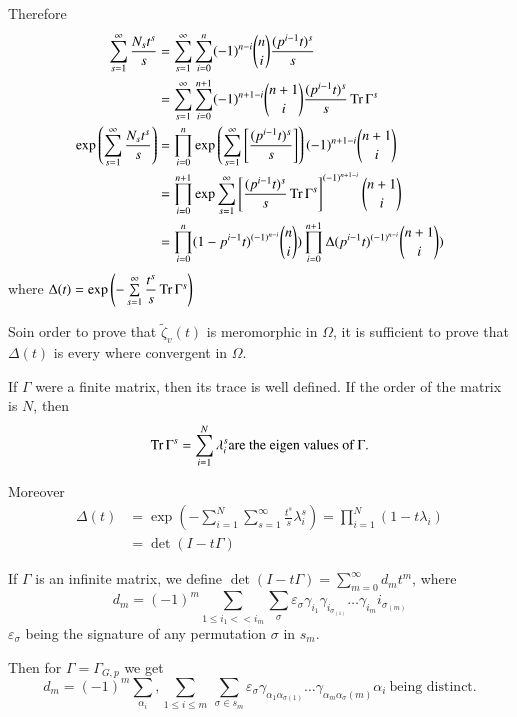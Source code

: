 Therefore
\begin{align*}
  \sum^{\infty}_{s=1} \frac{N_s t^s}{s} &= \sum^{\infty}_{s=1}
  \sum^{n}_{i=0} (-1)^{n-i} \binom{n}{i} \frac{(p^{i-1}t)^s}{s}
  \\ 
  &=\sum^{\infty}_{s=1} \sum^{n+1}_{i=0} (-1)^{n+1-i}
  \binom{n+1}{i}  \frac{(p^{i-1}t)^s}{s} \operatorname{Tr} \Gamma^s \\ 
  \exp \left( \sum^{\infty}_{s=1} \frac{N_s t^s}{s}\right) &= \prod^{n}_{i=0}
  \exp \left( \sum^{\infty}_{s=1} \left[\frac{(p^{i-1}t)^s}{s}
    \right]\right){(-1)^{n+1-i}} \binom{n+1}{i}\\  
  &=  \prod^{n+1}_{i=0} \exp \sum^{\infty}_{s=1}
  \left[\frac{(p^{i-1}t)^s}{s} \operatorname{Tr} \Gamma^s \right]^{(-1)^{n+1-i}}
  \binom{n+1}{i}\\ 
  &=  \prod^{n}_{i=0} (1-p^{i-1}t)^{(-1)^{n-i}} \binom{n}{i})
  \prod^{n+1}_{i=0} \Delta (p^{i-1}t)^{(-1)^{n-i}} \binom{n+1}{i}) 
\end{align*}  
where $\Delta (t) = \exp  \left( -\sum \limits^{\infty}_{s=1}
\dfrac{t^s}{s} \operatorname{Tr} \Gamma^s \right) $   
 
 So\pageoriginale in order to prove that $\tilde{\zeta}_v (t)$ is meromorphic in $\Omega$, it
 is sufficient to prove that $\Delta (t)$  is every where  convergent
 in $\Omega$. 
 
 If $\Gamma$ were a finite matrix, then its trace is well defined. If
 the order of the matrix is $N$, then 
 $$
 \operatorname{Tr} \Gamma^s = \sum^{N}_{i=1} \lambda^s_i \text{are the eigen values
   of} ~\Gamma. 
 $$
 
Moreover
\begin{align*}
  \Delta (t) &= \exp \left(- \sum^{N}_{i=1}  \sum^{\infty}_{s=1}
  \frac{t^s}{s} \lambda^s_i \right) = \prod^{N}_{i=1} (1-t \lambda_i)\\ 
  &= \det (I-t \Gamma )
\end{align*}  

If $\Gamma$ is an infinite matrix, we define $\det (I-t \Gamma) = \sum
\limits^{\infty}_{m = 0} d_m t^m$, where 
  $$
  d_m =(-1)^m \sum_{1 \leq i_1 < < i_m}
  \sum_{\sigma}\varepsilon_{\sigma}\gamma_{i_{1}}
  \gamma_{i_{\sigma_{(1)}}}  \ldots \gamma_{i_{m}} i_{\sigma_{(m)}} 
  $$
 $\varepsilon _{\sigma}$  being the signature of any permutation
  $\sigma$ in $s_m$. 
 
 Then for $\Gamma = \Gamma_{G,p}$ we get
 $$
 d_m = (-1)^m \sum_{\alpha_i}, \sum_{1 \leq i \leq m} ~
 \sum_{\sigma \in s_m} \varepsilon_{\sigma} \gamma_{\alpha_1 \alpha_{\sigma (1)}}
 \ldots \gamma_{\alpha_{m} \alpha _{\sigma }(m)}  \alpha_i ~\text{being distinct.} 
 $$
 

